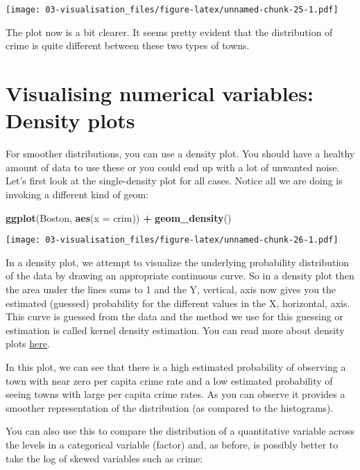 \documentclass[
]{book}
\newenvironment{Shaded}{\begin{snugshade}}{\end{snugshade}}
\newcommand{\AttributeTok}[1]{\textcolor[rgb]{0.13,0.29,0.53}{#1}}
\newcommand{\FunctionTok}[1]{\textcolor[rgb]{0.13,0.29,0.53}{\textbf{#1}}}
\newcommand{\NormalTok}[1]{#1}
\newcommand{\SpecialCharTok}[1]{\textcolor[rgb]{0.81,0.36,0.00}{\textbf{#1}}}
\begin{document}
\texttt{[image: 03-visualisation\_files/figure-latex/unnamed-chunk-25-1.pdf]}

The plot now is a bit clearer. It seems pretty evident that the distribution of crime is quite different between these two types of towns.

\section{Visualising numerical variables: Density plots}\label{visualising-numerical-variables-density-plots}

For smoother distributions, you can use a density plot. You should have a healthy amount of data to use these or you could end up with a lot of unwanted noise. Let's first look at the single-density plot for all cases. Notice all we are doing is invoking a different kind of geom:

\begin{Shaded}
\begin{Highlighting}[]
\FunctionTok{ggplot}\NormalTok{(Boston, }\FunctionTok{aes}\NormalTok{(}\AttributeTok{x =}\NormalTok{ crim)) }\SpecialCharTok{+}
  \FunctionTok{geom\_density}\NormalTok{() }
\end{Highlighting}
\end{Shaded}

\texttt{[image: 03-visualisation\_files/figure-latex/unnamed-chunk-26-1.pdf]}

In a density plot, we attempt to visualize the underlying probability distribution of the data by drawing an appropriate continuous curve. So in a density plot then the area under the lines sums to 1 and the Y, vertical, axis now gives you the estimated (guessed) probability for the different values in the X, horizontal, axis. This curve is guessed from the data and the method we use for this guessing or estimation is called kernel density estimation. You can read more about density plots \href{https://serialmentor.com/dataviz/histograms-density-plots.html}{here}.

In this plot, we can see that there is a high estimated probability of observing a town with near zero per capita crime rate and a low estimated probability of seeing towns with large per capita crime rates. As you can observe it provides a smoother representation of the distribution (as compared to the histograms).

You can also use this to compare the distribution of a quantitative variable across the levels in a categorical variable (factor) and, as before, is possibly better to take the log of skewed variables such as crime:
\end{document}
